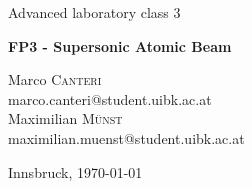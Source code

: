 \documentclass[a4paper,10pt]{article}
\begin{document}
\begin{titlepage}
 \begin{center}
	\Large{Advanced laboratory class 3}
	\end{center}
	\begin{center}
	 \LARGE{\textbf{FP3 - Supersonic Atomic Beam}}
	\end{center}

	\begin{center}

	\large Marco \textsc{Canteri} \\
	marco.canteri@student.uibk.ac.at\\
	\large Maximilian \textsc{Münst} \\
	maximilian.muenst@student.uibk.ac.at
	\end{center}

	\begin{center}
	\vspace{1cm}
	Innsbruck, \today
	\vspace{1cm}
	\end{center}

	\begin{abstract}

  \end{abstract}
  \vspace{1cm}


\end{titlepage}
\end{document}
